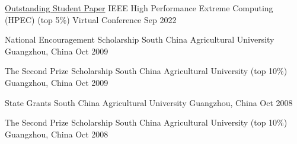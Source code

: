 



\begin{cvhonors}

  \cvhonor
    {\href{https://ieee-hpec.org/index.php/ieee-hpec-2022-prelim-agenda/}{Outstanding Student Paper}} %
    {IEEE High Performance Extreme Computing (HPEC) (top 5\%)} %
    {Virtual Conference} %
    {Sep 2022} %

  \cvhonor
    {National Encouragement Scholarship} %
    {South China Agricultural University} %
    {Guangzhou, China} %
    {Oct 2009} %

  \cvhonor
    {The Second Prize Scholarship} %
    {South China Agricultural University (top 10\%)} %
    {Guangzhou, China} %
    {Oct 2009} %

  \cvhonor
    {State Grants} %
    {South China Agricultural University} %
    {Guangzhou, China} %
    {Oct 2008} %

  \cvhonor
    {The Second Prize Scholarship} %
    {South China Agricultural University (top 10\%)} %
    {Guangzhou, China} %
    {Oct 2008} %

\end{cvhonors}



